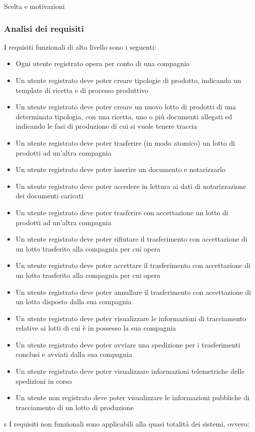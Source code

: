 \documentclass[a4paper,11pt]{article}
\begin{document}
Scelta e motivazioni

\subsubsection{Analisi dei requisiti}

I requisiti funzionali di alto livello sono i seguenti:

\begin{itemize}
  \item Ogni utente registrato opera per conto di una compagnia
  \item Un utente registrato deve poter creare tipologie di prodotto, indicando un template di ricetta e di processo produttivo
  \item Un utente registrato deve poter creare un nuovo lotto di prodotti di una determinata tipologia, con una ricetta, uno o più documenti allegati ed indicando le fasi di produzione di cui si vuole tenere traccia
  \item Un utente registrato deve poter trasferire (in modo atomico) un lotto di prodotti ad un'altra compagnia
  \item Un utente registrato deve poter inserire un documento e notarizzarlo
  \item Un utente registrato deve poter accedere in lettura ai dati di notarizzazione dei documenti caricati
  \item Un utente registrato deve poter trasferire con accettazione un lotto di prodotti ad un'altra compagnia
  \item Un utente registrato deve poter rifiutare il trasferimento con accettazione di un lotto trasferito alla compagnia per cui opera
  \item Un utente registrato deve poter accettare il trasferimento con accettazione di un lotto trasferito alla compagnia per cui opera
  \item Un utente registrato deve poter annullare il trasferimento con accettazione di un lotto disposto dalla sua compagnia
  \item Un utente registrato deve poter visualizzare le informazioni di tracciamento relative ai lotti di cui è in possesso la sua compagnia
  \item Un utente registrato deve poter avviare una spedizione per i trasferimenti conclusi e avviati dalla sua compagnia
  \item Un utente registrato deve poter visualizzare informazioni telemetriche delle spedizioni in corso
  \item Un utente non registrato deve poter visualizzare le informazioni pubbliche di tracciamento di un lotto di produzione
\end{itemize}
s
I requisiti non funzionali sono applicabili alla quasi totalità dei sistemi, ovvero:
\end{document}

